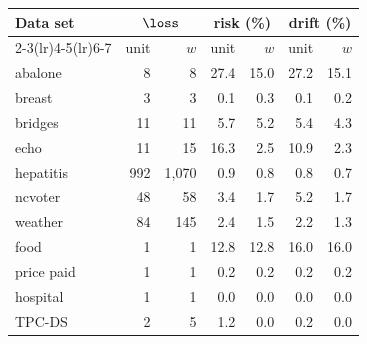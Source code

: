 \begin{tabular}{lrrrrrr}
\toprule
Data set & \multicolumn{2}{c}{$\loss$} & \multicolumn{2}{c}{risk (\%)} & \multicolumn{2}{c}{drift (\%)}\\
\cmidrule(lr){2-3}\cmidrule(lr){4-5}\cmidrule(lr){6-7}
 & unit & $w$ & unit & $w$ & unit & $w$\\
\midrule
abalone & 8 & 8 & 27.4 & 15.0 & 27.2 & 15.1\\
breast & 3 & 3 & 0.1 & 0.3 & 0.1 & 0.2\\
bridges & 11 & 11 & 5.7 & 5.2 & 5.4 & 4.3\\
echo & 11 & 15 & 16.3 & 2.5 & 10.9 & 2.3\\
hepatitis & 992 & 1,070 & 0.9 & 0.8 & 0.8 & 0.7\\
ncvoter & 48 & 58 & 3.4 & 1.7 & 5.2 & 1.7\\
weather & 84 & 145 & 2.4 & 1.5 & 2.2 & 1.3\\
\midrule
food & 1 & 1 & 12.8 & 12.8 & 16.0 & 16.0\\
price paid & 1 & 1 & 0.2 & 0.2 & 0.2 & 0.2\\
hospital & 1 & 1 & 0.0 & 0.0 & 0.0 & 0.0\\
TPC-DS & 2 & 5 & 1.2 & 0.0 & 0.2 & 0.0\\
\bottomrule
\end{tabular}
